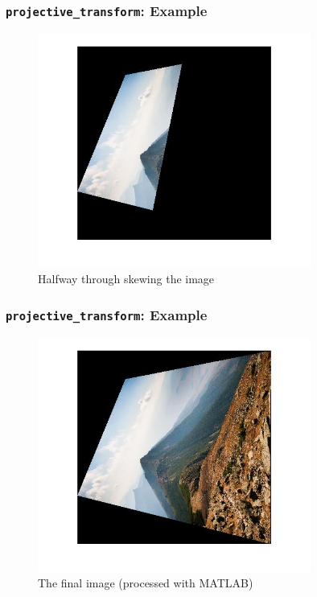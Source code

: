 \documentclass{beamer}
\begin{document}
\begin{frame}
	\frametitle{{\tt projective\_transform}: Example}
	\begin{figure}
		\centering
		\includegraphics[width=0.8\textwidth]{projected_halfway.jpg}
		\caption{Halfway through skewing the image}
	\end{figure}
\end{frame}

\begin{frame}
	\frametitle{{\tt projective\_transform}: Example}
	\begin{figure}
		\centering
		\includegraphics[width=0.8\textwidth]{projected_final.jpg}
		\caption{The final image (processed with MATLAB)}
	\end{figure}
\end{frame}
\end{document}
